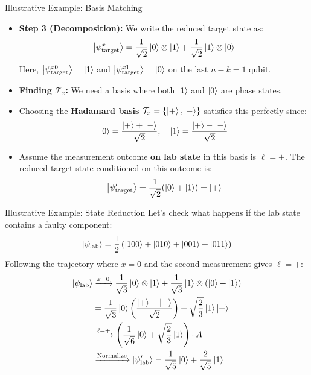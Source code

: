 \begin{frame}{Illustrative Example: Basis Matching}
    \begin{itemize}
        \item \textbf{Step 3 (Decomposition):} We write the reduced target state as:
        \[
            \ket{\psi_{\text{target}}^x} = \frac{1}{\sqrt{2}}\ket{0} \otimes \ket{1} + \frac{1}{\sqrt{2}} \ket{1} \otimes \ket{0}
        \]
        Here, $\ket{\psi_{\text{target}}^{x0}} = \ket{1}$ and $\ket{\psi_{\text{target}}^{x1}} = \ket{0}$ on the last $n-k = 1$ qubit.
        \item \textbf{Finding $\mathcal{T}_x$:} We need a basis where both $\ket{1}$ and $\ket{0}$ are phase states. 
        \item Choosing the \textbf{Hadamard basis} $\mathcal{T}_x = \{\ket{+}, \ket{-}\}$ satisfies this perfectly since:
        \[
            \ket{0} = \frac{\ket{+} + \ket{-}}{\sqrt{2}}, \quad \ket{1} = \frac{\ket{+} - \ket{-}}{\sqrt{2}}
        \]
        \item Assume the measurement outcome \textbf{on lab state} in this basis is $\ell = +$. The reduced target state conditioned on this outcome is:
        \[
            \ket{\psi_{\text{target}}'} =\frac{1}{\sqrt{2}}(\ket{0} + \ket{1}) = \ket{+}
        \]
    \end{itemize}
\end{frame}

\begin{frame}{Illustrative Example: State Reduction}
    Let's check what happens if the lab state contains a faulty component:
    \[
        \ket{\psi_{\text{lab}}} = \frac{1}{2}\left(\ket{100} + \ket{010} + \ket{001} + \ket{011}\right)
    \]
    Following the trajectory where $x=0$ and the second measurement gives $\ell = +$:
    \begin{align*}
        \ket{\psi_{\text{lab}}} &\xrightarrow{x=0} \frac{1}{\sqrt{3}} \ket{0} \otimes \ket{1} + \frac{1}{\sqrt{3}} \ket{1} \otimes (\ket{0} + \ket{1}) \\
        &= \frac{1}{\sqrt{3}} \ket{0} \left(\frac{\ket{+} - \ket{-}}{\sqrt{2}}\right) + \sqrt{\frac{2}{3}} \ket{1}\ket{+} \\
        &\xrightarrow{\ell = +} \left(\frac{1}{\sqrt{6}} \ket{0} + \sqrt{\frac{2}{3}} \ket{1}\right) \cdot A \\
        &\xrightarrow{\text{Normalize}} \ket{\psi_{\text{lab}}'} = \frac{1}{\sqrt{5}} \ket{0} + \frac{2}{\sqrt{5}} \ket{1}
    \end{align*}
\end{frame}

